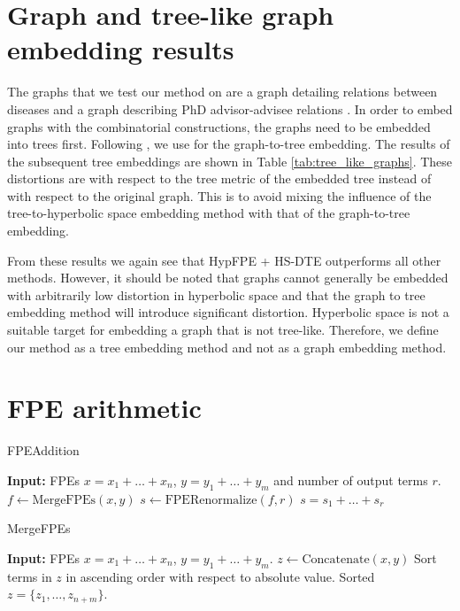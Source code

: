 


\section{Graph and tree-like graph embedding results}\label{sec:graphs}
The graphs that we test our method on are a graph detailing relations between diseases \citep{goh2007human} and a graph describing PhD advisor-advisee relations \citep{de2018exploratory}. In order to embed graphs with the combinatorial constructions, the graphs need to be embedded into trees first. Following \citep{sala2018representation}, we use \citep{abraham2007reconstructing} for the graph-to-tree embedding. The results of the subsequent tree embeddings are shown in Table \ref{tab:tree_like_graphs}. These distortions are with respect to the tree metric of the embedded tree instead of with respect to the original graph. This is to avoid mixing the influence of the tree-to-hyperbolic space embedding method with that of the graph-to-tree embedding.

From these results we again see that HypFPE + HS-DTE outperforms all other methods. However, it should be noted that graphs cannot generally be embedded with arbitrarily low distortion in hyperbolic space and that the graph to tree embedding method will introduce significant distortion. Hyperbolic space is not a suitable target for embedding a graph that is not tree-like. Therefore, we define our method as a tree embedding method and not as a graph embedding method.




\section{FPE arithmetic}\label{sec:fpe_arithmetic}
\begin{algorithm}
    \caption{FPEAddition}\label{alg:fpe_add}
    \begin{algorithmic}[1]
        \STATE \textbf{Input:} FPEs $x = x_1 + \ldots + x_n$, $y = y_1 + \ldots + y_m$ and number of output terms $r$.
        \STATE $f \gets \text{MergeFPEs}(x, y)$
        \STATE $s \gets \text{FPERenormalize}(f, r)$
        \RETURN $s = s_1 + \ldots + s_r$
    \end{algorithmic}
\end{algorithm}

\begin{algorithm}
    \caption{MergeFPEs}\label{alg:merge_fpe}
    \begin{algorithmic}[1]
        \STATE \textbf{Input:} FPEs $x = x_1 + \ldots + x_n$, $y = y_1 + \ldots + y_m$.
        \STATE $z \gets \text{Concatenate}(x, y)$
        \STATE Sort terms in $z$ in ascending order with respect to absolute value.
        \RETURN Sorted $z = \{z_1, \ldots, z_{n + m}\}$.
    \end{algorithmic}
\end{algorithm}

